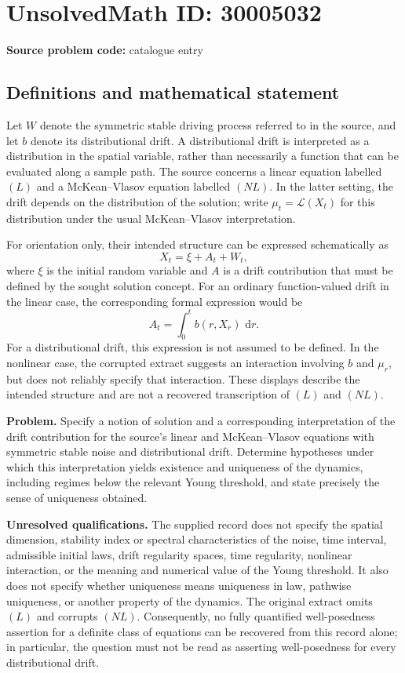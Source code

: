 \documentclass[11pt]{article}
\newcommand{\dd}{\,\mathrm{d}}
\begin{document}
\section*{UnsolvedMath ID: 30005032}
\textbf{Source problem code:} catalogue entry
\subsection{Definitions and mathematical statement}
Let \(W\) denote the symmetric stable driving process referred to in the source, and let \(b\) denote its distributional drift. A distributional drift is interpreted as a distribution in the spatial variable, rather than necessarily a function that can be evaluated along a sample path. The source concerns a linear equation labelled \((L)\) and a McKean--Vlasov equation labelled \((NL)\). In the latter setting, the drift depends on the distribution of the solution; write \(\mu_t=\mathcal L(X_t)\) for this distribution under the usual McKean--Vlasov interpretation.

For orientation only, their intended structure can be expressed schematically as
\[
X_t=\xi+A_t+W_t,
\]
where \(\xi\) is the initial random variable and \(A\) is a drift contribution that must be defined by the sought solution concept. For an ordinary function-valued drift in the linear case, the corresponding formal expression would be
\[
A_t=\int_0^t b(r,X_r)\,\dd r.
\]
For a distributional drift, this expression is not assumed to be defined. In the nonlinear case, the corrupted extract suggests an interaction involving \(b\) and \(\mu_r\), but does not reliably specify that interaction. These displays describe the intended structure and are not a recovered transcription of \((L)\) and \((NL)\).

\textbf{Problem.} Specify a notion of solution and a corresponding interpretation of the drift contribution for the source's linear and McKean--Vlasov equations with symmetric stable noise and distributional drift. Determine hypotheses under which this interpretation yields existence and uniqueness of the dynamics, including regimes below the relevant Young threshold, and state precisely the sense of uniqueness obtained.

\textbf{Unresolved qualifications.} The supplied record does not specify the spatial dimension, stability index or spectral characteristics of the noise, time interval, admissible initial laws, drift regularity spaces, time regularity, nonlinear interaction, or the meaning and numerical value of the Young threshold. It also does not specify whether uniqueness means uniqueness in law, pathwise uniqueness, or another property of the dynamics. The original extract omits \((L)\) and corrupts \((NL)\). Consequently, no fully quantified well-posedness assertion for a definite class of equations can be recovered from this record alone; in particular, the question must not be read as asserting well-posedness for every distributional drift.
\end{document}
